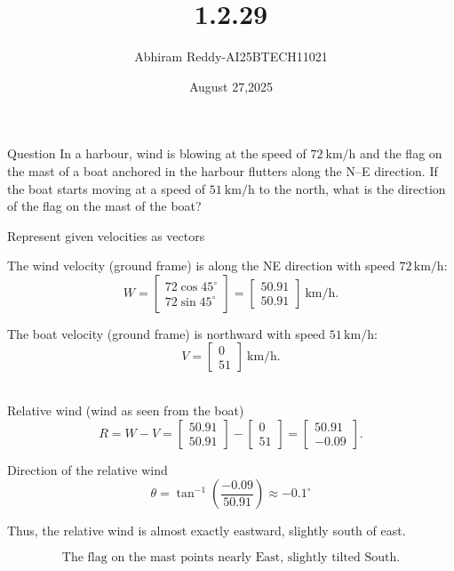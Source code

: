 \documentclass{beamer}
\title 
{1.2.29}
\date{August 27,2025}
\author 
{Abhiram Reddy-AI25BTECH11021}
\begin{document}
\frame{\titlepage}
\begin{frame}{Question}
In a harbour, wind is blowing at the speed of $72\ \mathrm{km/h}$ and the flag on the mast of a boat anchored in the harbour flutters along the N--E direction. If the boat starts moving at a speed of $51\ \mathrm{km/h}$ to the north, what is the direction of the flag on the mast of the boat?
\end{frame}



\begin{frame}{Represent given velocities as vectors}

The wind velocity (ground frame) is along the NE direction with speed $72 \,\text{km/h}$:
\[
W = \begin{bmatrix} 72 \cos 45^\circ \\ 72 \sin 45^\circ \end{bmatrix}
= \begin{bmatrix} 50.91 \\ 50.91 \end{bmatrix} \ \text{km/h}.
\]

The boat velocity (ground frame) is northward with speed $51 \,\text{km/h}$:
\[
V = \begin{bmatrix} 0 \\ 51 \end{bmatrix} \ \text{km/h}.
\]\\

\end{frame}

\begin{frame}{Relative wind (wind as seen from the boat)}
\[
R = W - V
= \begin{bmatrix} 50.91 \\ 50.91 \end{bmatrix} -
\begin{bmatrix} 0 \\ 51 \end{bmatrix}
= \begin{bmatrix} 50.91 \\ -0.09 \end{bmatrix}.
\]
\end{frame}
\begin{frame}{Direction of the relative wind}
\[
\theta = \tan^{-1}\left(\frac{-0.09}{50.91}\right) \approx -0.1^\circ
\]

Thus, the relative wind is almost exactly eastward, slightly south of east.

\[
\boxed{\text{The flag on the mast points nearly East, slightly tilted South.}}
\]
\end{frame}
\end{document}
